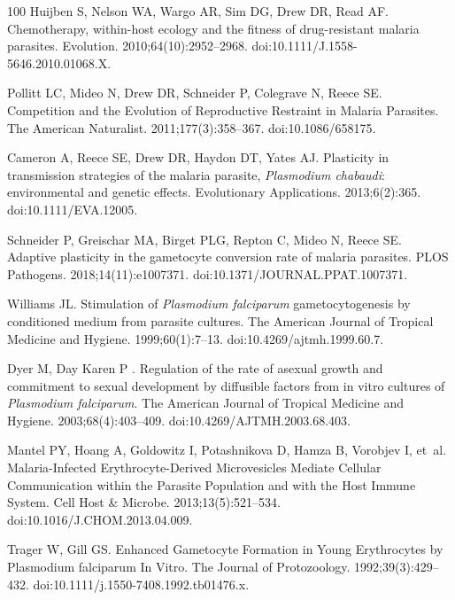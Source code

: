 \documentclass[10pt,letterpaper]{article}
\begin{document}
\begin{thebibliography}{100}
Huijben S, Nelson WA, Wargo AR, Sim DG, Drew DR, Read AF.
\newblock Chemotherapy, within-host ecology and the fitness of drug-resistant malaria parasites.
\newblock Evolution. 2010;64(10):2952--2968.
\newblock doi:{10.1111/J.1558-5646.2010.01068.X}.

Pollitt LC, Mideo N, Drew DR, Schneider P, Colegrave N, Reece SE.
\newblock Competition and the {Evolution} of {Reproductive} {Restraint} in {Malaria} {Parasites}.
\newblock The American Naturalist. 2011;177(3):358--367.
\newblock doi:{10.1086/658175}.

Cameron A, Reece SE, Drew DR, Haydon DT, Yates AJ.
\newblock Plasticity in transmission strategies of the malaria parasite, \textit{{Plasmodium} chabaudi}: environmental and genetic effects.
\newblock Evolutionary Applications. 2013;6(2):365.
\newblock doi:{10.1111/EVA.12005}.

Schneider P, Greischar MA, Birget PLG, Repton C, Mideo N, Reece SE.
\newblock Adaptive plasticity in the gametocyte conversion rate of malaria parasites.
\newblock PLOS Pathogens. 2018;14(11):e1007371.
\newblock doi:{10.1371/JOURNAL.PPAT.1007371}.

Williams JL.
\newblock Stimulation of \textit{{Plasmodium} falciparum} gametocytogenesis by conditioned medium from parasite cultures.
\newblock The American Journal of Tropical Medicine and Hygiene. 1999;60(1):7--13.
\newblock doi:{10.4269/ajtmh.1999.60.7}.

Dyer M, {Day Karen P }.
\newblock Regulation of the rate of asexual growth and commitment to sexual development by diffusible factors from in vitro cultures of \textit{{Plasmodium} falciparum}.
\newblock The American Journal of Tropical Medicine and Hygiene. 2003;68(4):403--409.
\newblock doi:{10.4269/AJTMH.2003.68.403}.

Mantel PY, Hoang A, Goldowitz I, Potashnikova D, Hamza B, Vorobjev I, et~al.
\newblock Malaria-{Infected} {Erythrocyte}-{Derived} {Microvesicles} {Mediate} {Cellular} {Communication} within the {Parasite} {Population} and with the {Host} {Immune} {System}.
\newblock Cell Host \& Microbe. 2013;13(5):521--534.
\newblock doi:{10.1016/J.CHOM.2013.04.009}.

Trager W, Gill GS.
\newblock Enhanced {Gametocyte} {Formation} in {Young} {Erythrocytes} by {Plasmodium} falciparum {In} {Vitro}.
\newblock The Journal of Protozoology. 1992;39(3):429--432.
\newblock doi:{10.1111/j.1550-7408.1992.tb01476.x}.


\end{thebibliography}
\end{document}
